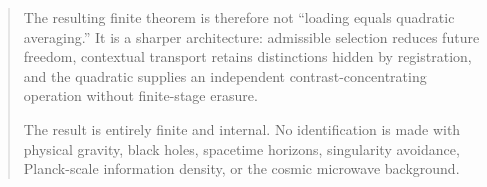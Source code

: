 \documentclass[11pt]{article}
\begin{document}
\begin{abstract}
The resulting finite theorem is therefore not
``loading equals quadratic averaging.''  It is a sharper architecture:
admissible selection reduces future freedom, contextual transport
retains distinctions hidden by registration, and the quadratic
supplies an independent contrast-concentrating operation without
finite-stage erasure.

The result is entirely finite and internal.  No identification is
made with physical gravity, black holes, spacetime horizons,
singularity avoidance, Planck-scale information density, or the
cosmic microwave background.
\end{abstract}

\tableofcontents




















\end{document}
